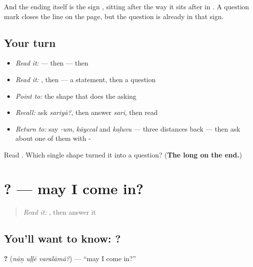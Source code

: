 And the ending itself is the sign \textbf{}, sitting after  the way it sits after  in \textbf{}. A question mark closes the line on the page, but the question is already in that sign.

\subsection*{Your turn}
\begin{itemize}
\raggedright
  \item \emph{Read it:} \textbf{} — then \textbf{} — then \textbf{}
  \item \emph{Read it:} \textbf{}, then \textbf{} — a statement, then a question
  \item \emph{Point to:} the shape that does the asking
  \item \emph{Recall:} ask \emph{sariyā?}, then answer \emph{sari}, then read \textbf{}
  \item \emph{Return to:} say \emph{-um}, \emph{kāyccal} and \emph{kaḻuvu} — three distances back — then ask about one of them with -
\end{itemize}

\begin{tcolorbox}[breakable,colback=teal!4,colframe=teal!35!black,title={Before you move on}]
Read \textbf{}. Which single shape turned it into a question? (\textbf{The long  on the end.})
\end{tcolorbox}
\section[\texorpdfstring{\ta{நான்} \ta{உள்ளே} \ta{வரலாமா}? (nāṉ uḷḷē varalāmā?)}{நான் உள்ளே வரலாமா? (nāṉ uḷḷē varalāmā?)}]{  ? — may I come in?}

\label{lesson:TA-C75-permission}



\begin{quote}
\emph{Read it:} \textbf{}, then answer it
\end{quote}

\subsection*{You'll want to know: ?}
\textbf{  ?} (\emph{nāṉ uḷḷē varalāmā?}) — \textquotedblleft{}may I come in?\textquotedblright{}

